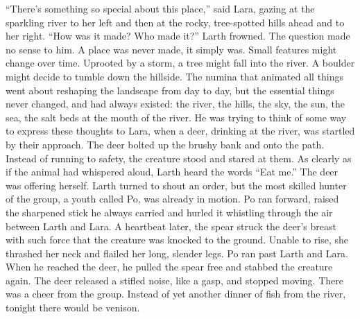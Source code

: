 “There’s something so special about this place,” said Lara, gazing at the sparkling river to her left and then at the rocky, tree-spotted hills ahead and to her right. “How was it made? Who made it?”
Larth frowned. The question made no sense to him. A place was never made, it simply was. Small features might change over time. Uprooted by a storm, a tree might fall into the river. A boulder might decide to tumble down the hillside. The numina that animated all things went about reshaping the landscape from day to day, but the essential things never changed, and had always existed: the river, the hills, the sky, the sun, the sea, the salt beds at the mouth of the river.
He was trying to think of some way to express these thoughts to Lara, when a deer, drinking at the river, was startled by their approach. The deer bolted up the brushy bank and onto the path. Instead of running to safety, the creature stood and stared at them. As clearly as if the animal had whispered aloud, Larth heard the words “Eat me.” The deer was offering herself.
Larth turned to shout an order, but the most skilled hunter of the group, a youth called Po, was already in motion. Po ran forward, raised the sharpened stick he always carried and hurled it whistling through the air between Larth and Lara.
A heartbeat later, the spear struck the deer’s breast with such force that the creature was knocked to the ground. Unable to rise, she thrashed her neck and flailed her long, slender legs. Po ran past Larth and Lara. When he reached the deer, he pulled the spear free and stabbed the creature again. The deer released a stifled noise, like a gasp, and stopped moving.
There was a cheer from the group. Instead of yet another dinner of fish from the river, tonight there would be venison.
